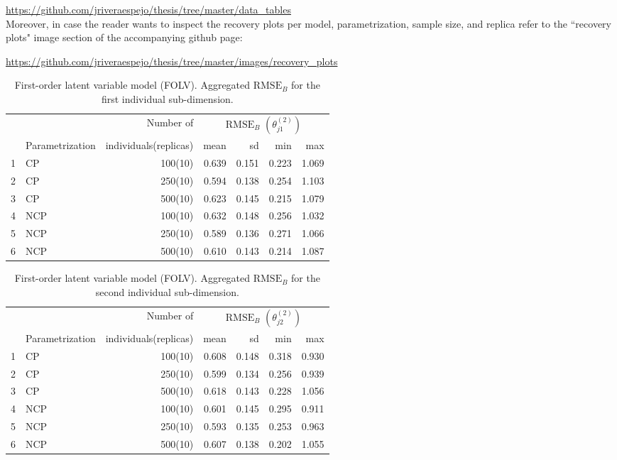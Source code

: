 \noindent \url{https://github.com/jriveraespejo/thesis/tree/master/data_tables} \\

Moreover, in case the reader wants to inspect the recovery plots per model, parametrization, sample size, and replica refer to the ``recovery plots" image section of the accompanying github page:

\noindent \url{https://github.com/jriveraespejo/thesis/tree/master/images/recovery_plots} \\
%
\begin{table}[H]
	\centering
	\begin{tabular}{rlrrrrr}
		\hline
		\multicolumn{2}{c}{ } & Number of & \multicolumn{4}{c}{ $\text{RMSE}_{B}$ $( \theta^{(2)}_{j1} )$ } \\ 
		\cmidrule(rl){4-7}
		& Parametrization & individuals(replicas) & mean & sd & min & max \\  
		\hline\hline
		1 & CP &  100(10) & 0.639 & 0.151 & 0.223 & 1.069 \\ 
		2 & CP &  250(10) & 0.594 & 0.138 & 0.254 & 1.103 \\ 
		3 & CP &  500(10) & 0.623 & 0.145 & 0.215 & 1.079 \\ 
		\hline
		4 & NCP &  100(10) & 0.632 & 0.148 & 0.256 & 1.032 \\  
		5 & NCP &  250(10) & 0.589 & 0.136 & 0.271 & 1.066 \\ 
		6 & NCP &  500(10) & 0.610 & 0.143 & 0.214 & 1.087 \\  
		\hline
	\end{tabular}
	\caption[First-order latent variable model (FOLV). Aggregated $\text{RMSE}_{B}$ for the first individual sub-dimension.]%
	{First-order latent variable model (FOLV). Aggregated $\text{RMSE}_{B}$ for the first individual sub-dimension.}
	\label{tab:FOLV_RMSE_theta1}
\end{table}
%
\begin{table}[H]
	\centering
	\begin{tabular}{rlrrrrr}
		\hline
		\multicolumn{2}{c}{ } & Number of & \multicolumn{4}{c}{ $\text{RMSE}_{B}$ $( \theta^{(2)}_{j2} )$} \\ 
		\cmidrule(rl){4-7}
		& Parametrization & individuals(replicas) & mean & sd & min & max \\  
		\hline\hline
		1 & CP &  100(10) & 0.608 & 0.148 & 0.318 & 0.930 \\ 
		2 & CP &  250(10) & 0.599 & 0.134 & 0.256 & 0.939 \\  
		3 & CP &  500(10) & 0.618 & 0.143 & 0.228 & 1.056 \\  
		\hline
		4 & NCP &  100(10) & 0.601 & 0.145 & 0.295 & 0.911 \\ 
		5 & NCP &  250(10) & 0.593 & 0.135 & 0.253 & 0.963 \\ 
		6 & NCP &  500(10) & 0.607 & 0.138 & 0.202 & 1.055 \\
		\hline
	\end{tabular}
	\caption[First-order latent variable model (FOLV). Aggregated $\text{RMSE}_{B}$ for the second individual sub-dimension.]%
	{First-order latent variable model (FOLV). Aggregated $\text{RMSE}_{B}$ for the second individual sub-dimension.}
	\label{tab:FOLV_RMSE_theta2}
\end{table}
